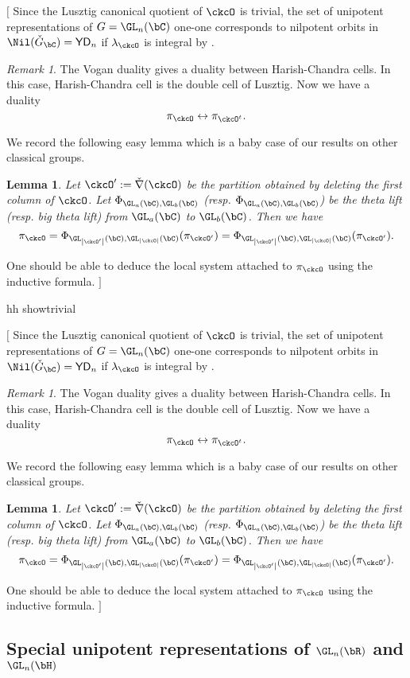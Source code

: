 \documentclass[12pt]{amsart}
\newcommand{\trivial}[2][]{\if\relax\detokenize{#1}\relax
  {%
      \color{orange} \vspace{0em}$[$#2$]$
      \color{black}
  }
  \else
\ifx#1h
\ifcsname showtrivial\endcsname
{%
    \color{orange}\vspace{0em}$[$#2$]$
    \color{black}
}
\fi
\else {\red Wrong argument!} \fi
\fi
}
\def\abs#1{\left|{#1}\right|}
\def\DDD{{\check\nabla}}
\numberwithin{equation}{section}
\newtheorem{lem}[thm]{Lemma}
\theoremstyle{remark}
\newtheorem{remark}[thm]{Remark}
\def\half{{\tfrac{1}{2}}}
\def\ckGc{\check{G}_{\bC}}
\def\YD{\mathsf{YD}}
\def\lamck{\lambda_\ckcO}
\def\DDD{{\check\nabla}}
\begin{document}


\trivial[h]{
Since the Lusztig canonical quotient of $\ckcO$ is trivial, the set of unipotent representations
of $G = \GL_n(\bC)$ one-one corresponds to nilpotent orbits in
$\Nil(\ckGc) = \YD_{n}$ if $\lamck$ is integral by
\cite{BVUni}.


\begin{remark}
The Vogan duality gives a duality between Harish-Chandra cells.
In this case, Harish-Chandra cell is the double cell
of Lusztig.
Now we have a duality
\[
 \pi_\ckcO \leftrightarrow \pi_{\ckcO^t}.
\]
\end{remark}

We record the following easy lemma which is a baby case of our results on other
classical groups.
\begin{lem}
  Let $\ckcO' := \DDD(\ckcO)$ be the partition obtained by deleting the first
  column of $\ckcO$. Let $\Phi_{\GL_{a}(\bC),\GL_{b}(\bC)}$ (resp.
  $\Phi_{\GL_{a}(\bC),\GL_{b}(\bC)}$) be the theta lift (resp. big theta lift)
  from $\GL_a(\bC)$ to $\GL_b(\bC)$. Then we have
  \[
    \pi_{\ckcO} = \Phi_{\GL_{\abs{\ckcO'}}(\bC),\GL_{\abs{\ckcO}}(\bC)} (\pi_{\ckcO'})= \Phi_{\GL_{\abs{\ckcO'}}(\bC),\GL_{\abs{\ckcO}}(\bC)} (\pi_{\ckcO'}).
  \]
\end{lem}

One should be able to deduce the local system attached to $\pi_{\ckcO}$ using
the inductive formula.
}

\subsection{Special unipotent representations of $\GL_n(\bR)$ and $\GL_n(\bH)$}\label{sec:GLRH11}




\end{document}
